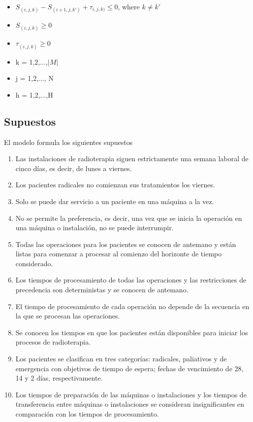 \documentclass[letter, 10pt]{article}
\begin{document}
\begin{itemize}
    \item $S_{(i,j,k)} - S_{(i+1, j, k')}+ \tau_{i, j, k)} \leq 0$, where $k \neq k'$
    \item $S_{(i,j,k)} \geq 0$
    \item $\tau_{(i,j,k)} \geq 0$
    \item k = 1,2,...,$\lvert M \rvert$
    \item j = 1,2,..., N
    \item h = 1,2,...,H
\end{itemize}

\subsection{Supuestos}
El modelo formula los siguientes supuestos
\begin{enumerate}
\item Las instalaciones de radioterapia siguen estrictamente una semana laboral de cinco días, es decir, de lunes a viernes.
\item Los pacientes radicales no comienzan sus tratamientos los viernes.
\item Solo se puede dar servicio a un paciente en una máquina a la vez.
\item No se permite la preferencia, es decir, una vez que se inicia la operación en una máquina o instalación, no se puede interrumpir.
\item Todas las operaciones para los pacientes se conocen de antemano y están listas para comenzar a procesar al comienzo del horizonte de tiempo considerado.
\item Los tiempos de procesamiento de todas las operaciones y las restricciones de precedencia son deterministas y se conocen de antemano.
\item El tiempo de procesamiento de cada operación no depende de la secuencia en la que se procesan las operaciones.
\item Se conocen los tiempos en que los pacientes están disponibles para iniciar los procesos de radioterapia.
\item Los pacientes se clasifican en tres categorías: radicales, paliativos y de emergencia con objetivos de tiempo de espera; fechas de vencimiento de 28, 14 y 2 días, respectivamente.
\item Los tiempos de preparación de las máquinas o instalaciones y los tiempos de transferencia entre máquinas o instalaciones se consideran insignificantes en comparación con los tiempos de procesamiento.

\end{enumerate}
\end{document}
